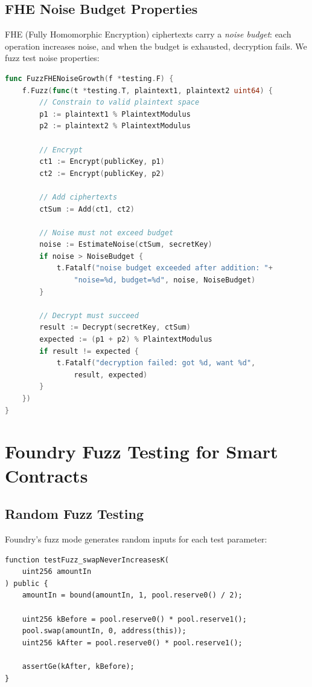 \documentclass[11pt,a4paper]{article}
\begin{document}
\subsection{FHE Noise Budget Properties}

FHE (Fully Homomorphic Encryption) ciphertexts carry a \emph{noise budget}: each
operation increases noise, and when the budget is exhausted, decryption fails. We fuzz
test noise properties:

\begin{lstlisting}[language=Go,caption={FHE noise budget fuzz test}]
func FuzzFHENoiseGrowth(f *testing.F) {
    f.Fuzz(func(t *testing.T, plaintext1, plaintext2 uint64) {
        // Constrain to valid plaintext space
        p1 := plaintext1 % PlaintextModulus
        p2 := plaintext2 % PlaintextModulus

        // Encrypt
        ct1 := Encrypt(publicKey, p1)
        ct2 := Encrypt(publicKey, p2)

        // Add ciphertexts
        ctSum := Add(ct1, ct2)

        // Noise must not exceed budget
        noise := EstimateNoise(ctSum, secretKey)
        if noise > NoiseBudget {
            t.Fatalf("noise budget exceeded after addition: "+
                "noise=%d, budget=%d", noise, NoiseBudget)
        }

        // Decrypt must succeed
        result := Decrypt(secretKey, ctSum)
        expected := (p1 + p2) % PlaintextModulus
        if result != expected {
            t.Fatalf("decryption failed: got %d, want %d",
                result, expected)
        }
    })
}
\end{lstlisting}

\section{Foundry Fuzz Testing for Smart Contracts}

\subsection{Random Fuzz Testing}

Foundry's fuzz mode generates random inputs for each test parameter:

\begin{lstlisting}[language=Solidity,caption={Foundry fuzz test with bound}]
function testFuzz_swapNeverIncreasesK(
    uint256 amountIn
) public {
    amountIn = bound(amountIn, 1, pool.reserve0() / 2);

    uint256 kBefore = pool.reserve0() * pool.reserve1();
    pool.swap(amountIn, 0, address(this));
    uint256 kAfter = pool.reserve0() * pool.reserve1();

    assertGe(kAfter, kBefore);
}
\end{lstlisting}
\end{document}
